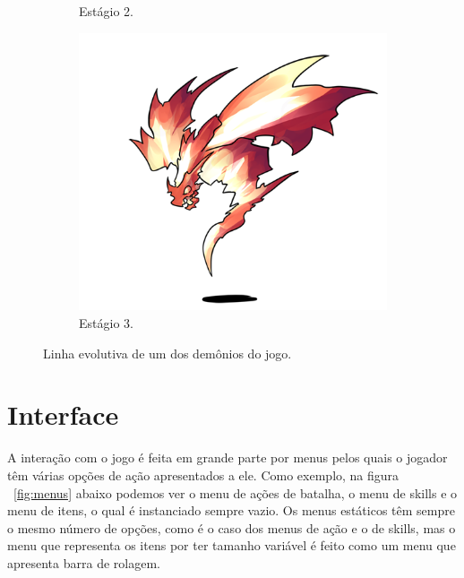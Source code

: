 \begin{figure}[h!]
\begin{subfigure}[b]{0.3\linewidth}
    \caption{Estágio 2.}
  \end{subfigure}
  \begin{subfigure}[b]{0.45\linewidth}
    \includegraphics[width=\linewidth]{stage3.png}
    \caption{Estágio 3.}
  \end{subfigure}
  \caption{Linha evolutiva de um dos demônios do jogo.}
  \label{fig:evolution}
\end{figure}

\section{Interface}

A interação com o jogo é feita em grande parte por menus pelos quais o jogador têm várias opções de ação apresentados a ele. Como exemplo, na figura ~\ref{fig:menus} abaixo podemos ver o menu de ações de batalha, o menu de skills e o menu de itens, o qual é instanciado sempre vazio. Os menus estáticos têm sempre o mesmo número de opções, como é o caso dos menus de ação e o de skills, mas o menu que representa os itens por ter tamanho variável é feito como um menu que apresenta barra de rolagem.

